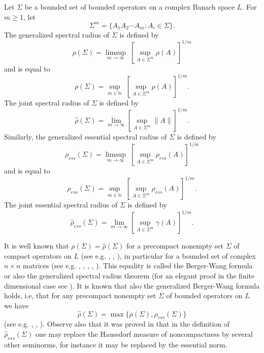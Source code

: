 \documentclass[12pt, reqno]{amsart}
\theoremstyle{definition}
\theoremstyle{remark}
\numberwithin{equation}{section}
\newcommand{\be}{\begin{equation}}
\newcommand{\ee}{\end{equation}}
\newcommand{\CC}{\mathbb{C}} %
\newcommand{\NN}{\mathbb{N}}
\begin{document}
Let $\Sigma$ be a bounded set of bounded operators on a complex Banach space $L$.
For $m \ge 1$, let
$$\Sigma ^m =\{A_1A_2 \cdots A_m : A_i \in \Sigma\}.$$
The generalized spectral radius of $\Sigma$ is defined by
\be
\rho (\Sigma)= \limsup _{m \to \infty} \;[\sup _{A \in \Sigma ^m} \rho (A)]^{1/m}
\label{genrho}
\ee
and is equal to
$$\rho (\Sigma)= \sup _{m \in \NN} \;[\sup _{A \in \Sigma ^m} \rho (A)]^{1/m}.$$
The joint spectral radius of $\Sigma$ is defined by
\be
\hat{\rho}  (\Sigma)= \lim _{m \to \infty}[\sup _{A \in \Sigma ^m} \|A\|]^{1/m}.
\label{BW}
\ee
Similarly, the generalized essential spectral radius of $\Sigma$ is defined by
\be
\rho _{ess} (\Sigma)= \limsup _{m \to \infty} \;[\sup _{A \in \Sigma ^m} \rho _{ess} (A)]^{1/m}
\label{genrhoess}
\ee
and is equal to
$$\rho _{ess} (\Sigma)= \sup _{m \in \NN} \;[\sup _{A \in \Sigma ^m} \rho _{ess} (A)]^{1/m}.$$
The joint essential  spectral radius of $\Sigma$ is defined by
\be
\hat{\rho} _{ess}  (\Sigma)= \lim _{m \to \infty}[\sup _{A \in \Sigma ^m} \gamma (A)]^{1/m}.
\label{jointess}
\ee

It is well known that $\rho (\Sigma)= \hat{\rho}  (\Sigma)$ for a precompact nonempty set $\Sigma$ of compact operators on $L$ (see e.g. \cite{ShT00}, \cite{ShT08}, \cite{Mo}),
in particular for a bounded set of complex $n\times n$ matrices (see e.g. \cite{BW92}, \cite{E95}, \cite{SWP97}, \cite{Dai11}, \cite{MP12}).
This equality is called the Berger-Wang formula or also the
generalized spectral radius theorem (for an elegant proof in the finite dimensional case see \cite{Dai11}).
It is known that also the generalized Berger-Wang formula holds, i.e, that for any precompact nonempty  set $\Sigma$ of bounded operators on $L$ we have
$$\hat{\rho}  (\Sigma) = \max \{\rho (\Sigma), \hat{\rho} _{ess}  (\Sigma)\}$$
(see e.g.  \cite{ShT08}, \cite{Mo},  \cite{ShT00}). Observe also that it was proved in \cite{Mo} that in the definition of  $\hat{\rho} _{ess}  (\Sigma)$ one may replace the Haussdorf measure of noncompactness by several other seminorms, for instance it may be replaced by the essential norm.
\end{document}
